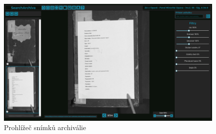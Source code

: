 \begin{figure}[htbp]
\centering
    \includegraphics[scale=.4]{obrazky-figures/design/figma/Gallery Page.png}
    \caption{Prohlížeč snímků archiválie}
\end{figure}




